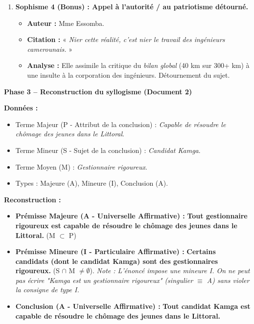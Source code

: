 \documentclass[11pt]{article}
\begin{document}
\begin{exoresolu}
\begin{enumerate}
\begin{itemize}
    \end{itemize}
    \item \textbf{Sophisme 4 (Bonus) : Appel à l'autorité / au patriotisme détourné.}
    \begin{itemize}
        \item \textbf{Auteur :} Mme Essomba.
        \item \textbf{Citation :} « \emph{Nier cette réalité, c'est nier le travail des ingénieurs camerounais.} »
        \item \textbf{Analyse :} Elle assimile la critique du \emph{bilan global} (40 km sur 300+ km) à une insulte à la corporation des ingénieurs. Détournement du sujet.
    \end{itemize}
\end{enumerate}

\medskip
\noindent\textbf{Phase 3 -- Reconstruction du syllogisme (Document 2)}

\noindent\textbf{Données :}
\begin{itemize}
    \item Terme Majeur (P - Attribut de la conclusion) : \emph{Capable de résoudre le chômage des jeunes dans le Littoral}.
    \item Terme Mineur (S - Sujet de la conclusion) : \emph{Candidat Kamga}.
    \item Terme Moyen (M) : \emph{Gestionnaire rigoureux}.
    \item Types : Majeure (A), Mineure (I), Conclusion (A).
\end{itemize}

\noindent\textbf{Reconstruction :}
\begin{itemize}
    \item \textbf{Prémisse Majeure (A - Universelle Affirmative) :} \textbf{Tout gestionnaire rigoureux est capable de résoudre le chômage des jeunes dans le Littoral.} (M $\subset$ P)
    \item \textbf{Prémisse Mineure (I - Particulaire Affirmative) :} \textbf{Certains candidats (dont le candidat Kamga) sont des gestionnaires rigoureux.} (S $\cap$ M $\neq \emptyset$). \emph{Note : L'énoncé impose une mineure I. On ne peut pas écrire "Kamga est un gestionnaire rigoureux" (singulier $\equiv$ A) sans violer la consigne de type I.}
    \item \textbf{Conclusion (A - Universelle Affirmative) :} \textbf{Tout candidat Kamga est capable de résoudre le chômage des jeunes dans le Littoral.}
\end{itemize}


\end{exoresolu}
\end{document}
